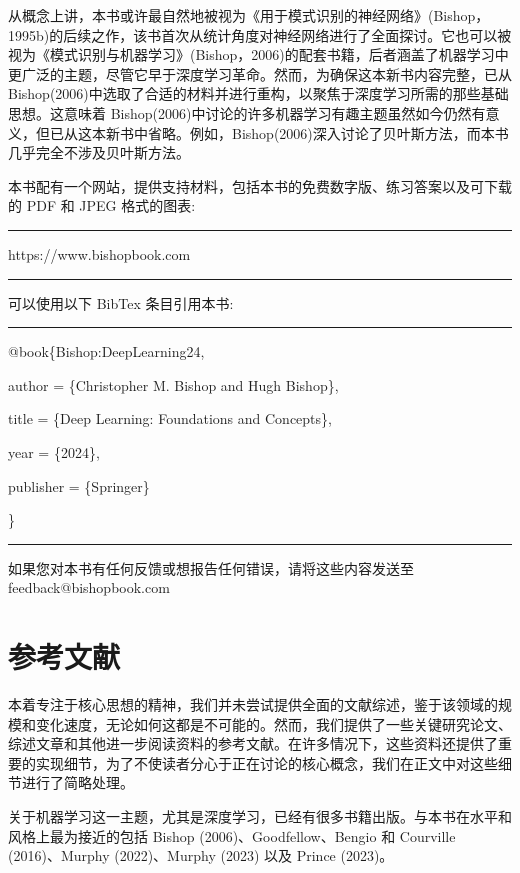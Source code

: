 \documentclass[10pt]{report}
\newcommand{\HRule}{\begin{center}\rule{0.9\linewidth}{0.2mm}\end{center}}
\begin{document}
从概念上讲，本书或许最自然地被视为《用于模式识别的神经网络》(Bishop，1995b)的后续之作，该书首次从统计角度对神经网络进行了全面探讨。它也可以被视为《模式识别与机器学习》(Bishop，2006)的配套书籍，后者涵盖了机器学习中更广泛的主题，尽管它早于深度学习革命。然而，为确保这本新书内容完整，已从 Bishop(2006)中选取了合适的材料并进行重构，以聚焦于深度学习所需的那些基础思想。这意味着 Bishop(2006)中讨论的许多机器学习有趣主题虽然如今仍然有意义，但已从这本新书中省略。例如，Bishop(2006)深入讨论了贝叶斯方法，而本书几乎完全不涉及贝叶斯方法。

本书配有一个网站，提供支持材料，包括本书的免费数字版、练习答案以及可下载的 PDF 和 JPEG 格式的图表:

\HRule

https://www.bishopbook.com

\HRule

可以使用以下 BibTex 条目引用本书:

\HRule

@book\{Bishop:DeepLearning24,

\hspace*{1em} author = \{Christopher M. Bishop and Hugh Bishop\},

\hspace*{1em} title = \{Deep Learning: Foundations and Concepts\},

\hspace*{1em} year = \{2024\},

\hspace*{1em} publisher = \{Springer\}

\}

\HRule

如果您对本书有任何反馈或想报告任何错误，请将这些内容发送至 feedback@bishopbook.com

\section*{参考文献}

本着专注于核心思想的精神，我们并未尝试提供全面的文献综述，鉴于该领域的规模和变化速度，无论如何这都是不可能的。然而，我们提供了一些关键研究论文、综述文章和其他进一步阅读资料的参考文献。在许多情况下，这些资料还提供了重要的实现细节，为了不使读者分心于正在讨论的核心概念，我们在正文中对这些细节进行了简略处理。

关于机器学习这一主题，尤其是深度学习，已经有很多书籍出版。与本书在水平和风格上最为接近的包括 Bishop (2006)、Goodfellow、Bengio 和 Courville (2016)、Murphy (2022)、Murphy (2023) 以及 Prince (2023)。
\end{document}
